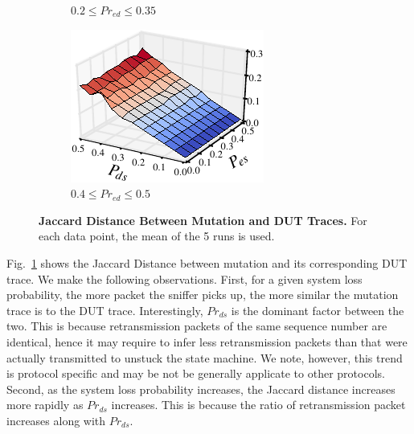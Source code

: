 \begin{figure}[h!]
\begin{subfigure}{0.33\textwidth}
    \caption{$0.2 \le Pr_{ed} \le 0.35$}
  \end{subfigure}\hspace*{0.01\textwidth}
  \begin{subfigure}{0.33\textwidth}
    \centering
    \includegraphics[width=\textwidth]{./figures/scripts/MutationDUTJaccard3DFigure_0_50.pdf}
    \caption{$0.4 \le Pr_{ed} \le 0.5$}
  \end{subfigure}\hspace*{0.01\textwidth}
  \caption{\textbf{Jaccard Distance Between Mutation and DUT Traces.} For each
  data point, the mean of the 5 runs is used.}
  \label{fig:mutation_dut}
  \vspace*{\aftercaptionskip}
\end{figure}


Fig.~\ref{fig:mutation_dut} shows the Jaccard Distance between mutation and
its corresponding DUT trace.
We make the following observations.
First, for a given system loss probability, the more packet the sniffer picks up,
the more similar the mutation trace is to the DUT trace.
Interestingly, $Pr_{ds}$ is the dominant factor between the two.
This is because retransmission packets of the same sequence number are
identical, hence it may require to infer less retransmission packets than that
were actually transmitted to unstuck the state machine.
We note, however, this
trend is protocol specific and may be not be generally applicate to other
protocols.
Second, as the system loss probability increases, the Jaccard distance increases
more rapidly as $Pr_{ds}$ increases.
This is because the ratio of retransmission
packet increases along with $Pr_{ds}$.


